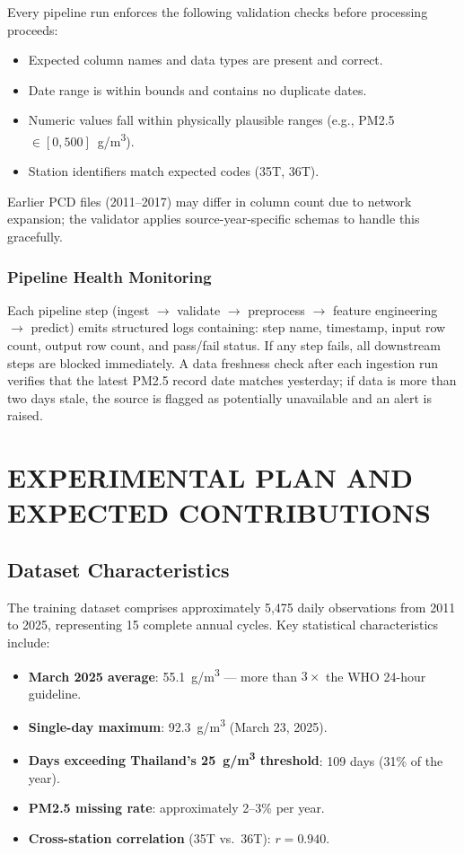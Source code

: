 \documentclass[12pt,a4paper]{report}
\begin{document}
Every pipeline run enforces the following validation checks before processing proceeds:
\begin{itemize}
  \item Expected column names and data types are present and correct.
  \item Date range is within bounds and contains no duplicate dates.
  \item Numeric values fall within physically plausible ranges (e.g., PM2.5 $\in [0, 500]$~\textmu g/m\textsuperscript{3}).
  \item Station identifiers match expected codes (35T, 36T).
\end{itemize}
Earlier PCD files (2011--2017) may differ in column count due to network expansion; the validator applies source-year-specific schemas to handle this gracefully.

\subsection{Pipeline Health Monitoring}

Each pipeline step (ingest $\to$ validate $\to$ preprocess $\to$ feature engineering $\to$ predict) emits structured logs containing: step name, timestamp, input row count, output row count, and pass/fail status. If any step fails, all downstream steps are blocked immediately. A data freshness check after each ingestion run verifies that the latest PM2.5 record date matches yesterday; if data is more than two days stale, the source is flagged as potentially unavailable and an alert is raised.

\chapter{EXPERIMENTAL PLAN AND EXPECTED CONTRIBUTIONS}

\section{Dataset Characteristics}

The training dataset comprises approximately 5,475 daily observations from 2011 to 2025, representing 15 complete annual cycles. Key statistical characteristics include:

\begin{itemize}
  \item \textbf{March 2025 average}: 55.1~\textmu g/m\textsuperscript{3} --- more than $3\times$ the WHO 24-hour guideline.
  \item \textbf{Single-day maximum}: 92.3~\textmu g/m\textsuperscript{3} (March 23, 2025).
  \item \textbf{Days exceeding Thailand's 25~\textmu g/m\textsuperscript{3} threshold}: 109 days (31\% of the year).
  \item \textbf{PM2.5 missing rate}: approximately 2--3\% per year.
  \item \textbf{Cross-station correlation} (35T vs.\ 36T): $r = 0.940$.
\end{itemize}
\end{document}
